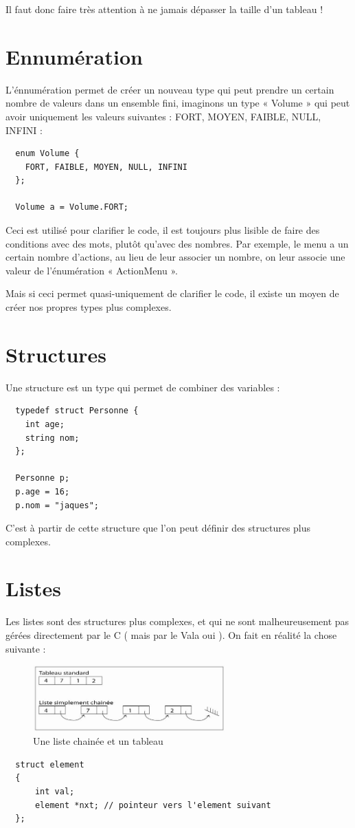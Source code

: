 Il faut donc faire très attention à ne jamais dépasser la taille d'un tableau !


\section{Ennumération}
L'énnumération permet de créer un nouveau type qui peut prendre 
un certain nombre de valeurs dans un ensemble fini, imaginons un type « Volume » 
qui peut avoir uniquement les valeurs suivantes : FORT, MOYEN, FAIBLE, NULL, INFINI : 

\begin{lstlisting} 
  enum Volume {
    FORT, FAIBLE, MOYEN, NULL, INFINI
  };
  
  Volume a = Volume.FORT;
\end{lstlisting}

Ceci est utilisé pour clarifier le code, il est toujours plus lisible de faire des conditions avec des mots, plutôt qu'avec des nombres.
Par exemple, le menu a un certain nombre d'actions, au lieu de leur associer un nombre, on leur associe une valeur de l'énumération « ActionMenu ».

Mais si ceci permet quasi-uniquement de clarifier le code, il existe un moyen de créer nos propres types plus complexes.

\section{Structures}
\label{DefStruct}
Une structure est un type qui permet de combiner des variables : 
\begin{lstlisting}
  typedef struct Personne {
    int age;
    string nom;
  };
  
  Personne p;
  p.age = 16;
  p.nom = "jaques";
\end{lstlisting}

C'est à partir de cette structure que l'on peut définir des structures plus complexes.

\section{Listes}
\label{DefListe}
Les listes sont des structures plus complexes, et qui ne sont malheureusement pas gérées directement par le C ( mais par le Vala oui ).
On fait en réalité la chose suivante : 
\begin{figure}[H]
	\begin{center}
	  \includegraphics[width=20em]{Annexes/Images/liste.jpg}
	\end{center}
	\caption{Une liste chainée et un tableau}
\end{figure}
\begin{lstlisting}
  struct element
  {
      int val;
      element *nxt; // pointeur vers l'element suivant
  };
\end{lstlisting}

